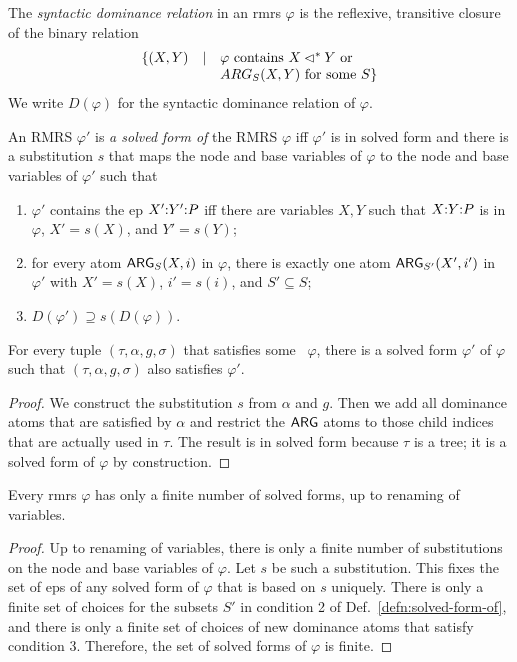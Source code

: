 \begin{definition}  \label{defn:solved-form-of}
  The \emph{syntactic dominance relation} in an {\sc  rmrs} $\varphi$ is the
  reflexive, transitive closure of the binary relation $$
\begin{array}{r c l}
\{(X,Y) & \mid &  \mbox{$\varphi$ contains $X \lhd^* Y$ or}\\
&& \mbox{$ARG_S(X,Y)$ for some
    $S$}\}
\end{array}
$$  
We write $D(\varphi)$ for the syntactic dominance
  relation of $\varphi$.

  An RMRS $\varphi'$ is \emph{a solved form of} the RMRS $\varphi$
  iff $\varphi'$ is in solved form and there is a substitution $s$
  that maps the  node and base variables of $\varphi$ to the node and
  base variables of $\varphi'$ such that
  \begin{enumerate}
  \item $\varphi'$ contains the {\sc ep} $X' {:} Y' {:} P$ iff there are
    variables $X,Y$ such that $X {:} Y {:} P$ is in $\varphi$, $X' =
    s(X)$, and $Y' = s(Y)$;
  \item for every atom $\mathsf{ARG}_S(X,i)$ in $\varphi$, there is exactly
    one atom $\mathsf{ARG}_{S'}(X',i')$ in $\varphi'$ with $X' = s(X)$, $i' =
    s(i)$, and $S' \subseteq S$;
  \item $D(\varphi') \supseteq s(D(\varphi))$.
  \end{enumerate}
\end{definition}

\begin{prop} \label{prop:models-satisfy-solved-forms}
  For every tuple $(\tau,\alpha,g,\sigma)$ that satisfies some \rmrs\
  $\varphi$, there is a solved form $\varphi'$ of $\varphi$ such that
  $(\tau,\alpha,g,\sigma)$ also satisfies $\varphi'$.
\end{prop}
\begin{proof}
  We construct the substitution $s$ from $\alpha$ and $g$.  Then we
  add all dominance atoms that are satisfied by $\alpha$ and restrict
  the $\mathsf{ARG}$ atoms to those child indices that are actually used in
  $\tau$.  The result is in solved form because $\tau$ is a tree; it
  is a solved form of $\varphi$ by construction.
\end{proof}

\begin{prop}  \label{prop:finite-solved-forms}
  Every {\sc rmrs} $\varphi$ has only a finite number of solved forms, up to
  renaming of variables.
\end{prop}
\begin{proof}
  Up to renaming of variables, there is only a finite number of
  substitutions on the node and base variables of $\varphi$.  Let $s$
  be such a substitution.  This fixes the set of {\sc ep}s of any
  solved form of $\varphi$ that is based on $s$ uniquely.  There is
  only a finite set of choices for the subsets $S'$ in condition 2 of
  Def.~\ref{defn:solved-form-of}, and there is only a finite set of
  choices of new dominance atoms that satisfy condition 3.  Therefore,
  the set of solved forms of $\varphi$ is finite.
\end{proof}

